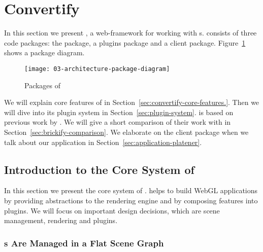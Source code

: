 \documentclass[../03-Architecture.tex]{subfiles}
\begin{document}
\section{Convertify}
\label{sec:framework-convertify}

In this section we present {\convertify}, a web-framework for working
with {\threedmodel}s. {\convertify} consists of three code packages:
the {\convertify} package, a plugins package and a client package.
Figure~\ref{fig:platener-package-diagram} shows a package diagram.

\begin{figure}[h]
  \centering
  \texttt{[image: 03-architecture-package-diagram]}
  \caption{Packages of {\convertify}}
  \label{fig:platener-package-diagram}
\end{figure}

We will explain core features of {\convertify} in
Section~\ref{sec:convertify-core-features.}. Then we will dive into
its plugin system in Section~\ref{sec:plugin-system}. {\convertify} is
based on previous work by \citeauthor{brickify-thesis}. We will give a
short comparison of their work with {\convertify} in
Section~\ref{sec:brickify-comparison}. We elaborate on the client
package when we talk about our application {\platener} in
Section~\ref{sec:application-platener}.



\subsection{Introduction to the Core System of {\convertify}}
\label{sec:convertify-core-features}

In this section we present the core system of {\convertify}.
{\convertify} helps to build WebGL applications by providing
abstractions to the rendering engine and by composing
features into plugins. We will focus on important design
decisions, which are scene management, rendering and
plugins.

\subsubsection{{\threedmodel}s Are Managed in a Flat Scene
  Graph}
\end{document}
